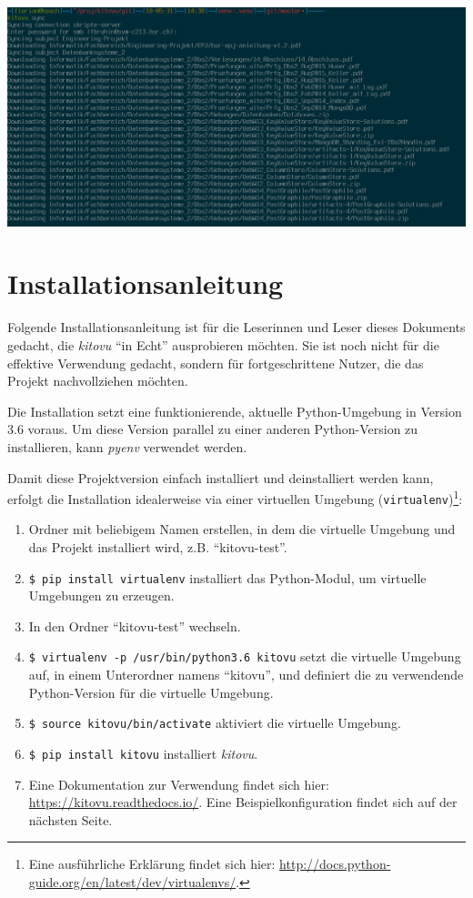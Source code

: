 \documentclass[a4paper]{article}
\let\oldsection\section
\renewcommand\section{\clearpage\oldsection}
\begin{document}
\includegraphics[width=\linewidth]{./img/screenshots/terminal.png}

\section{Installationsanleitung}

Folgende Installationsanleitung ist für die Leserinnen und Leser dieses Dokuments gedacht, die \emph{kitovu} ``in Echt'' ausprobieren möchten. Sie ist noch nicht für die effektive Verwendung gedacht, sondern für fortgeschrittene Nutzer, die das Projekt nachvollziehen möchten.

Die Installation setzt eine funktionierende, aktuelle Python-Umgebung in Version 3.6 voraus. Um diese Version parallel zu einer anderen Python-Version zu installieren, kann \emph{pyenv} verwendet werden.

Damit diese Projektversion einfach installiert und deinstalliert werden kann, erfolgt die Installation idealerweise via einer virtuellen Umgebung (\verb|virtualenv|)\footnote{Eine ausführliche Erklärung findet sich hier: \url{http://docs.python-guide.org/en/latest/dev/virtualenvs/}.}:

\begin{enumerate}
	\item Ordner mit beliebigem Namen erstellen, in dem die virtuelle Umgebung und das Projekt installiert wird, z.B. ``kitovu-test''.
	\item \verb|$ pip install virtualenv| \newline
	installiert das Python-Modul, um virtuelle Umgebungen zu erzeugen.
	\item In den Ordner ``kitovu-test'' wechseln.
	\item \verb|$ virtualenv -p /usr/bin/python3.6 kitovu| \newline
	setzt die virtuelle Umgebung auf, in einem Unterordner namens ``kitovu'', und definiert die zu verwendende Python-Version für die virtuelle Umgebung.
	\item \verb|$ source kitovu/bin/activate| \newline
	aktiviert die virtuelle Umgebung.
	\item \verb|$ pip install kitovu| \newline 
	installiert \emph{kitovu}.
	\item Eine Dokumentation zur Verwendung findet sich hier: \url{https://kitovu.readthedocs.io/}. Eine Beispielkonfiguration findet sich auf der nächsten Seite.
\end{enumerate}
\end{document}
